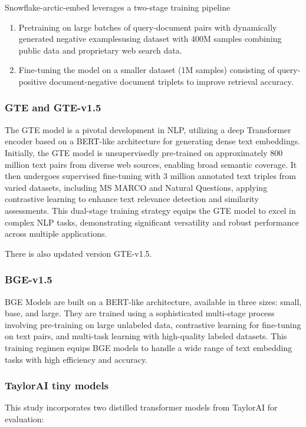 Snowflake-arctic-embed leverages a two-stage training pipeline
\begin{enumerate}
  \item Pretraining on large batches of query-document pairs with dynamically generated negative examplesusing dataset with 400M samples combining public data and proprietary web search data.
  \item Fine-tuning the model on a smaller dataset (1M samples) consisting of query-positive document-negative document triplets to improve retrieval accuracy.
\end{enumerate}

\subsubsection{GTE and GTE-v1.5} \label{model:gte}
The \ac{GTE} model is a pivotal development in \ac{NLP}, utilizing a deep Transformer encoder based on a \ac{BERT}-like architecture for generating dense text embeddings.
Initially, the \ac{GTE} model is unsupervisedly pre-trained on approximately 800 million text pairs from diverse web sources, enabling broad semantic coverage.
It then undergoes supervised fine-tuning with 3 million annotated text triples from varied datasets, including MS MARCO and Natural Questions, applying contrastive learning to enhance text relevance detection and similarity assessments.
This dual-stage training strategy equips the \ac{GTE} model to excel in complex \ac{NLP} tasks, demonstrating significant versatility and robust performance across multiple applications.

There is also updated version \ac{GTE}-v1.5.

\subsubsection{BGE-v1.5} \label{model:bge}
\ac{BGE} Models \cite{bge_embedding} are built on a BERT-like architecture, available in three sizes: small, base, and large.
They are trained using a sophisticated multi-stage process involving pre-training on large unlabeled data, contrastive learning for fine-tuning on text pairs, and multi-task learning with high-quality labeled datasets.
This training regimen equips BGE models to handle a wide range of text embedding tasks with high efficiency and accuracy.


\subsubsection{TaylorAI tiny models} \label{model:taylorai}
This study incorporates two distilled transformer models from TaylorAI for evaluation:

